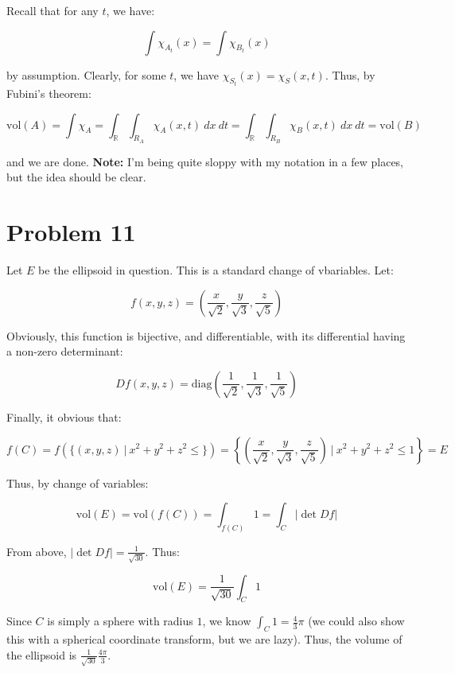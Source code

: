 \documentclass[10pt, oneside]{amsart}
\begin{document}
    Recall that for any $t$, we have:

    $$\displaystyle\int \chi_{A_t}(x) = \displaystyle\int \chi_{B_t}(x)$$

    by assumption. Clearly, for some $t$, we have $\chi_{S_t}(x) = \chi_{S}(x, t)$. Thus, by Fubini's theorem:

    $$\text{vol}(A) = \displaystyle\int \chi_{A} = \displaystyle\int_{\mathbb{R}} \displaystyle\int_{R_A} \chi_{A}(x, t) \ dx \ dt = \displaystyle\int_{\mathbb{R}} \displaystyle\int_{R_B} \chi_{B}(x, t) \ dx \ dt = \text{vol}(B)$$

    and we are done. \textbf{Note:} I'm being quite sloppy with my notation in a few places, but the idea should be clear.

    \hrulefill

    \section{Problem 11}

    Let $E$ be the ellipsoid in question. This is a standard change of vbariables. Let:

    $$f(x, y, z) = \left( \frac{x}{\sqrt{2}}, \frac{y}{\sqrt{3}}, \frac{z}{\sqrt{5}} \right)$$

    Obviously, this function is bijective, and differentiable, with its differential having a non-zero determinant:

    $$Df(x, y, z) = \text{diag} \left( \frac{1}{\sqrt{2}}, \frac{1}{\sqrt{3}}, \frac{1}{\sqrt{5}} \right)$$

    Finally, it obvious that:

    $$f(C) = f( \{(x, y, z) \ | \ x^2 + y^2 + z^2 \leq \}) = \left\{ \left( \frac{x}{\sqrt{2}}, \frac{y}{\sqrt{3}}, \frac{z}{\sqrt{5}} \right) \ \Big| \ x^2 + y^2 + z^2 \leq 1 \right\} = E$$

    Thus, by change of variables:

    $$\text{vol}(E) = \text{vol}(f(C)) = \displaystyle\int_{f(C)} 1 = \displaystyle\int_{C} | \det Df |$$

    From above, $| \det Df | = \frac{1}{\sqrt{30}}$. Thus:

    $$\text{vol}(E) = \frac{1}{\sqrt{30}} \displaystyle\int_{C} 1$$

    Since $C$ is simply a sphere with radius $1$, we know $\int_{C} 1 = \frac{4}{3} \pi$ (we could also show this with a spherical coordinate transform, but we are lazy). Thus,
    the volume of the ellipsoid is $\frac{1}{\sqrt{30}} \frac{4\pi}{3}$.
\end{document}
